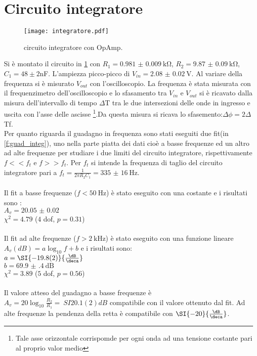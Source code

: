 \section{Circuito integratore}
\begin{figure}[h]
	\centering
	\texttt{[image: integratore.pdf]}
	\caption{circuito integratore con OpAmp.}
	\label{f:integratore}
\end{figure}
Si è montato il circuito in \ref{f:integratore} con $R_1= \SI{0.981(9)}{\kohm}$, $R_2= \SI{9.87(9)}{\kohm}$,$C_1= 48\pm2$nF. L'ampiezza picco-picco di $V_{in}=\SI{2.08(2)}{\V}$. Al variare della frequenza si è misurato $V_{out}$ con l'oscilloscopio. La frequenza è stata misurata con il frequenzimetro dell'oscilloscopio e lo sfasamento tra $V_{in}$ e $V_{out}$ si è ricavato dalla misura dell'intervallo di tempo $\Delta$T tra le due intersezioni delle onde in ingresso e uscita con l'asse delle ascisse \footnote{Tale asse orizzontale corrispomde per ogni onda ad una tensione costante pari al proprio valor medio}.Da questa misura si ricava lo sfasemento:$ \Delta\phi = 2\Delta$Tf.\\
Per quanto riguarda il guadagno in frequenza sono stati eseguiti due fit(in \ref{f:guad_integ}), uno nella parte piatta dei dati cioè a basse frequenze ed un altro ad alte frequenze per studiare i due limiti del circuito integratore, rispettivamente $f<<f_t$ e $f>>f_t$.
Per $f_t$ si intende la frequenza di taglio del circuito integratore pari a $f_t=\frac{1}{2\pi R_2C_1}= \SI{335(16)}{\Hz}$. \\
\\
Il fit a basse frequenze ($f< \SI{50}{\Hz}$) è stato eseguito con una costante e i risultati sono :\\
$A_v= \SI{20.05(2)}{}$\\
$\chi^2=4.79$ ($4$ dof, $p = 0.31$)\\
\\
Il fit ad alte frequenze ($f> \SI{2}{\kHz}$) è stato eseguito con una funzione lineare $A_v(dB)= a\log_{10} f +b$  e i risultati sono:\\
$a= \SI{-19.8(2)}{\frac{\dB}{\deca}}$\\
$b= \SI{69.9(4)}{\dB}$\\
$\chi^2=3.89$ ($5$ dof, $p = 0.56$)\\
\\
Il valore atteso del guadagno a basse frequenze è $A_v=20\log_{10} \frac{R_2}{R_1}= \ SI{20.1(2)}{dB}$ compatibile con il valore ottenuto dal fit.
Ad alte frequenze la pendenza della retta è compatibile con $\SI{-20}{\frac{\dB}{\deca}}$.\\
